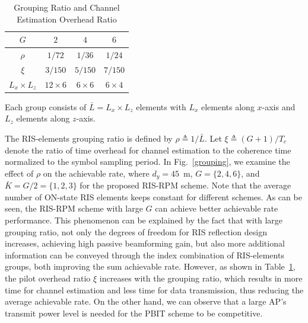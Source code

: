 \documentclass[draftclsnofoot,onecolumn,12pt]{IEEEtran}
\newcommand{\rev}[1]{{\color{red}#1}} %
\newcommand{\revh}[1]{{\color{black}#1}} %
\newcommand{\rev}[1]{#1}
\newcommand{\revh}[1]{#1}
\begin{document}
{\renewcommand{\arraystretch}{1.2}%
	\begin{table}[!t]
		\begin{center}\revh{\caption{Grouping Ratio and Channel Estimation Overhead Ratio}}
			\begin{tabular}{|c|c|c|c|}
				\hline
				$G$ & $2$ & $4$ & $6$  \\
				\hline
				$\rho$ & $1/72$ & $1/36$ & $1/24$ \\
				\hline
				$\xi$ & $3/150$ & $5/150$ & $7/150$ \\
				\hline
				$L_x \times L_z$ & $12 \times 6$ & $6 \times 6$ & $6 \times 4$ \\
				\hline
			\end{tabular}
			\label{grouping ratio}
		\end{center}
	\footnotesize{Each group consists of $\bar{L}=L_x \times L_z$ elements with $L_x$ elements along $x$-axis and $L_z$ elements along $z$-axis.}
\end{table}}

The RIS-elements grouping ratio is defined by $\rho\triangleq 1/\bar{L}$.  
Let $\xi\triangleq (G+1)/T_c$ denote the ratio of time overhead for channel estimation to the coherence time normalized to the symbol sampling period. 
In Fig.~\ref{grouping}, we examine the effect of $\rho$ on the achievable rate, where $d_y=45$~m, $G=\{2,4,6\}$, and $\bar{K}=G/2=\{1,2,3\}$ for the proposed RIS-RPM scheme. 
Note that the average number of ON-state RIS elements keeps constant for different schemes. 
As can be seen, the RIS-RPM scheme with large $G$ can achieve better achievable rate performance. 
This phenomenon can be explained by the fact that with large grouping ratio, not only the degrees of freedom for RIS reflection design increases, achieving high passive beamforming gain, but also more additional information can be conveyed through the index combination of RIS-elements groups, both improving the sum achievable rate. 
However, as shown in Table~\ref{grouping ratio}, the pilot overhead ratio $\xi$ increases with the grouping ratio, which results in more time for channel estimation and less time for data transmission, thus reducing the average achievable rate. 
\revh{On the other hand, we can observe that a large AP's transmit power level is needed for the PBIT scheme to be competitive.} 
\end{document}
